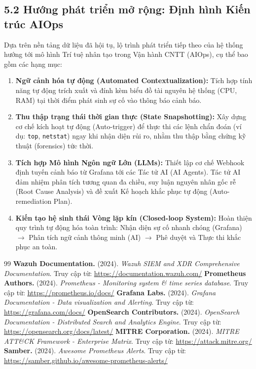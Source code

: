 \documentclass[13pt,a4paper]{extarticle}
\begin{document}
\subsection{5.2 Hướng phát triển mở rộng: Định hình Kiến trúc AIOps}
Dựa trên nền tảng dữ liệu đã hội tụ, lộ trình phát triển tiếp theo của hệ thống hướng tới mô hình Trí tuệ nhân tạo trong Vận hành CNTT (AIOps), cụ thể bao gồm các hạng mục:
\begin{enumerate}
    \item \textbf{Ngữ cảnh hóa tự động (Automated Contextualization):} Tích hợp tính năng tự động trích xuất và đính kèm biểu đồ tài nguyên hệ thống (CPU, RAM) tại thời điểm phát sinh sự cố vào thông báo cảnh báo.
    \item \textbf{Thu thập trạng thái thời gian thực (State Snapshotting):} Xây dựng cơ chế kích hoạt tự động (Auto-trigger) để thực thi các lệnh chẩn đoán (ví dụ: \texttt{top}, \texttt{netstat}) ngay khi nhận diện rủi ro, nhằm thu thập bằng chứng kỹ thuật (forensics) tức thời.
    \item \textbf{Tích hợp Mô hình Ngôn ngữ Lớn (LLMs):} Thiết lập cơ chế Webhook định tuyến cảnh báo từ Grafana tới các Tác tử AI (AI Agents). Tác tử AI đảm nhiệm phân tích tương quan đa chiều, suy luận nguyên nhân gốc rễ (Root Cause Analysis) và đề xuất Kế hoạch khắc phục tự động (Auto-remediation Plan).
    \item \textbf{Kiến tạo hệ sinh thái Vòng lặp kín (Closed-loop System):} Hoàn thiện quy trình tự động hóa toàn trình: Nhận diện sự cố nhanh chóng (Grafana) $\rightarrow$ Phân tích ngữ cảnh thông minh (AI) $\rightarrow$ Phê duyệt và Thực thi khắc phục an toàn.
\end{enumerate}

\begin{thebibliography}{99}
     \textbf{Wazuh Documentation.} (2024). \textit{Wazuh SIEM and XDR Comprehensive Documentation}. Truy cập từ: \url{https://documentation.wazuh.com/}
     \textbf{Prometheus Authors.} (2024). \textit{Prometheus - Monitoring system \& time series database}. Truy cập từ: \url{https://prometheus.io/docs/}
     \textbf{Grafana Labs.} (2024). \textit{Grafana Documentation - Data visualization and Alerting}. Truy cập từ: \url{https://grafana.com/docs/}
     \textbf{OpenSearch Contributors.} (2024). \textit{OpenSearch Documentation - Distributed Search and Analytics Engine}. Truy cập từ: \url{https://opensearch.org/docs/latest/}
     \textbf{MITRE Corporation.} (2024). \textit{MITRE ATT\&CK Framework - Enterprise Matrix}. Truy cập từ: \url{https://attack.mitre.org/}
     \textbf{Samber.} (2024). \textit{Awesome Prometheus Alerts}. Truy cập từ: \url{https://samber.github.io/awesome-prometheus-alerts/}
\end{thebibliography}
\end{document}
